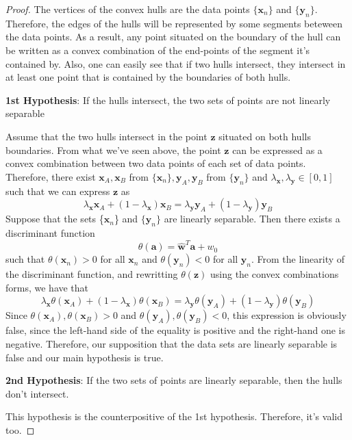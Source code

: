 \begin{proof}
    The vertices of the convex hulls are the data points $\{\mathbf{x}_n\}$ and $\{\mathbf{y}_n\}$. 
    Therefore, the edges of the hulls will be represented by some segments beteween the data points.
    As a result, any point situated on the boundary of the hull can be written as a convex
    combination of the end-points of the segment it's contained by. Also,
    one can easily see that if two hulls intersect, they intersect in at least one 
    point that is contained by the boundaries of both hulls. 

    \vspace{1em}
    \textbf{1st Hypothesis}: If the hulls intersect, the two sets of 
    points are not linearly separable
    \vspace{1em}

    Assume that the two hulls intersect in the point $\mathbf{z}$ situated
    on both hulls boundaries. From what we've seen above, 
    the point $\mathbf{z}$ can be expressed as a convex
    combination between two data points of each set of data points. Therefore,
    there exist 
    $\mathbf{x}_A, \mathbf{x}_B$ from $\{\mathbf{x}_n\}, \mathbf{y}_A, \mathbf{y}_B$
    from $\{\mathbf{y}_n\}$ and $\lambda_\mathbf{x}, \lambda_\mathbf{y} \in [0, 1]$ such that
    we can express $\mathbf{z}$ as
     \[
         \lambda_\mathbf{x} \mathbf{x}_A + (1 - \lambda_\mathbf{x}) \mathbf{x}_B = 
         \lambda_\mathbf{y} \mathbf{y}_A + (1 - \lambda_\mathbf{y}) \mathbf{y}_B
    \] 
    Suppose that the sets \{$\mathbf{x}_n$\} and $\{\mathbf{y}_n\}$ are linearly 
    separable. Then there exists a discriminant function
    \[
        \theta(\mathbf{a}) = \widehat{\mathbf{w}}^T \mathbf{a} + w_0
    \]
    such that $\theta(\mathbf{x}_n) > 0$ for all $\mathbf{x}_n$ and $\theta(\mathbf{y}_n) < 0$
    for all $\mathbf{y}_n$. From the linearity of the discriminant function, 
    and rewritting $\theta(\mathbf{z})$ using the convex combinations forms,
    we have that
    \[
        \lambda_\mathbf{x} \theta(\mathbf{x}_A) + (1 - \lambda_\mathbf{x}) \theta(\mathbf{x}_B)
        = \lambda_\mathbf{y} \theta(\mathbf{y}_A) + (1 - \lambda_\mathbf{y}) \theta(\mathbf{y}_B)
    \] 
    Since $\theta(\mathbf{x}_A), \theta(\mathbf{x}_B) > 0$ and 
    $\theta(\mathbf{y}_A), \theta(\mathbf{y}_B) < 0$, this
    expression is obviously false, since the left-hand side of the equality
    is positive and the right-hand one is negative. Therefore, our supposition
    that the data sets are linearly separable is false and our main hypothesis is true.

    \vspace{1em}
    \textbf{2nd Hypothesis}: If the two sets of points are linearly separable,
    then the hulls don't intersect. 
    \vspace{0.25em}

    This hypothesis is the counterpositive of the 1st hypothesis. Therefore,
    it's valid too.
\end{proof}


